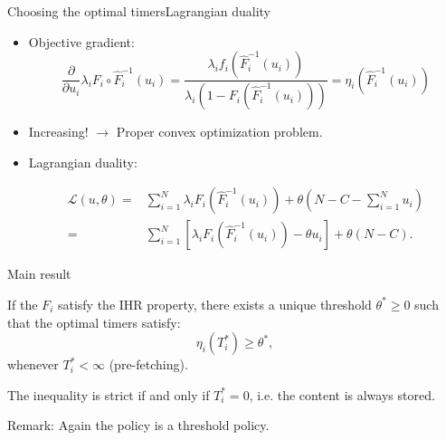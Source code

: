\documentclass[aspectratio=169]{beamer}
\begin{document}
\begin{frame}{Choosing the optimal timers}{Lagrangian duality}

	\begin{itemize}
		\item Objective gradient:
		\begin{equation*}
			\frac{\partial}{\partial u_i} \lambda_i F_i\circ\hat{F}^{-1}_i(u_i) = \frac{\lambda_i f_i(\hat{F}^{-1}_i(u_i))}{\lambda_i \left(1-F_i(\hat{F}^{-1}_i(u_i))\right)} = \eta_i(\hat{F}^{-1}_i(u_i))
		\end{equation*}

		\item \alert{Increasing!} $\to$ Proper convex optimization problem.
		
		\pause

		\item Lagrangian duality:
		
		\begin{align*}
  			\mathcal{L}(u,\theta) =& \sum_{i=1}^N \lambda_i F_i\left(\hat{F}^{-1}_i(u_i)\right) + \theta \left(N-C - \sum_{i=1}^N u_i\right) \\
			=& \sum_{i=1}^N \left[\lambda_i F_i\left(\hat{F}^{-1}_i(u_i)\right) - \theta u_i \right] + \theta (N-C).
		\end{align*}

	\end{itemize}

\end{frame}

\begin{frame}{Main result}

	\begin{theorem}
		If the $F_i$ satisfy the IHR property, there exists a unique threshold $\theta^*\geqslant 0$ such that the optimal timers satisfy:
		\begin{equation*}
		  \eta_i(T_i^*) \geqslant \theta^*,
		\end{equation*}
		whenever $T_i^*<\infty$ (pre-fetching). 
		
		The inequality is strict if and only if $T_i^*=0$, i.e. the content is always stored.
	\end{theorem}

	\pause

	\vfill
	
	
	\alert{Remark:} Again the policy is a threshold policy.

\end{frame}
\end{document}
